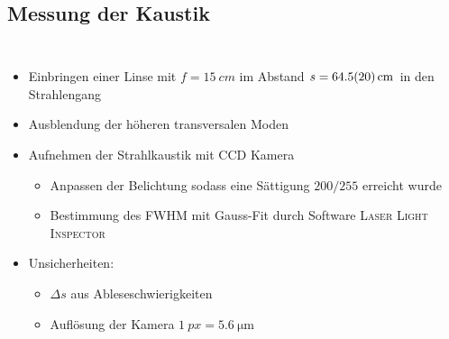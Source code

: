 \documentclass[10pt, aspectratio=169]{beamer}
\begin{document}
\subsection{Messung der Kaustik}
\begin{frame}
  \begin{columns}
    \begin{itemize}
    \item<1-> Einbringen einer Linse mit \(f=\SI{15}{cm}\) im Abstand
      \(s=\SI{64.5\pm 2.0}{\centi\meter}\) in den Strahlengang
    \item<2-> Ausblendung der h\"oheren transversalen Moden
    \item<3-> Aufnehmen der Strahlkaustik mit
      CCD Kamera
      \begin{itemize}
      \item Anpassen der Belichtung sodass eine S\"attigung
        \(200/255\) erreicht wurde
      \item Bestimmung des FWHM mit Gauss-Fit durch Software
        \textsc{Laser Light Inspector} 
      \end{itemize}
    \item<4-> Unsicherheiten:
      \begin{itemize}
      \item \(\Delta s\) aus Ableseschwierigkeiten
      \item Aufl\"osung der Kamera
        \(\SI{1}{px}=\SI{5.6}{\micro\meter}\)
      \end{itemize}
    \end{itemize}
     

\end{columns}
\end{frame}
\end{document}
